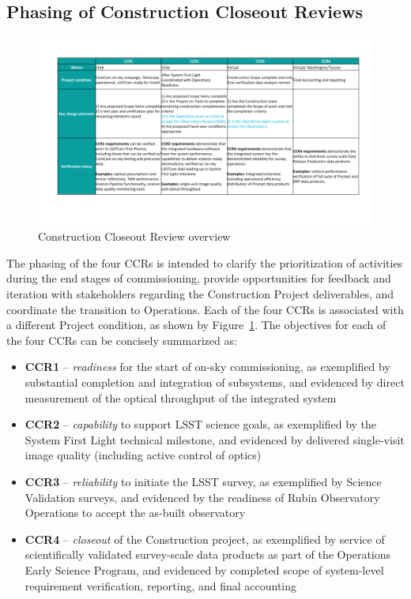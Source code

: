 \subsection{Phasing of Construction Closeout Reviews}
\label{ccr}

\begin{figure}[htbp]
    \begin{center}
    \includegraphics[width=1\textwidth]{./CCRs_overview.png}
    \caption{Construction Closeout Review overview}
    \label{CCRs_overview}
    \end{center}
\end{figure}

The phasing of the four CCRs is intended to clarify the prioritization of activities during the end stages of commissioning, provide opportunities for feedback and iteration with stakeholders regarding the Construction Project deliverables, and coordinate the transition to Operations.
Each of the four CCRs is associated with a different Project condition, as shown by Figure~\ref{CCRs_overview}.
The objectives for each of the four CCRs can be concisely summarized as:

\begin{itemize}

    \item \textbf{CCR1} -- \emph{readiness} for the start of on-sky commissioning, as exemplified by substantial completion and integration of subsystems, and evidenced by direct measurement of the optical throughput of the integrated system

    \item \textbf{CCR2} -- \emph{capability} to support LSST science goals, as exemplified by the System First Light technical milestone, and evidenced by delivered single-visit image quality (including active control of optics)

    \item \textbf{CCR3} -- \emph{reliability} to initiate the LSST survey, as exemplified by Science Validation surveys, and evidenced by the readiness of Rubin Observatory Operations to accept the as-built observatory

    \item \textbf{CCR4} -- \emph{closeout} of the Construction project, as exemplified by service of scientifically validated survey-scale data products as part of the Operations Early Science Program, and evidenced by completed scope of system-level requirement verification, reporting, and final accounting

\end{itemize}